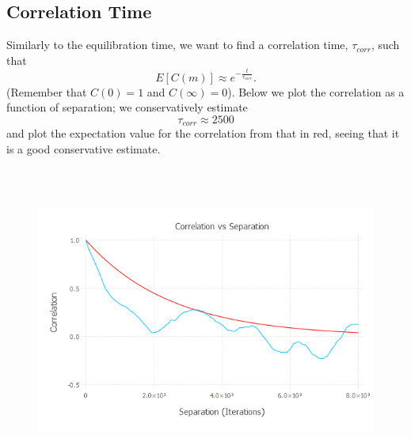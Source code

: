 \documentclass{article}
\begin{document}
\subsection{Correlation Time}
Similarly to the equilibration time, we want to find a correlation time, $\tau_{corr}$, such that
$$E[C(m)] \approx e^{-\frac{t}{\tau_{corr}}}.$$
(Remember that $C(0) = 1$ and $C(\infty) = 0$). Below we plot the correlation as a function of separation; we conservatively estimate
$$\tau_{corr} \approx 2500$$
and plot the expectation value for the correlation from that in red, seeing that it is a good conservative estimate.

\begin{figure}[H]
	\includegraphics[width=6in,height=4in]{"correlation"}
\end{figure}
\end{document}
